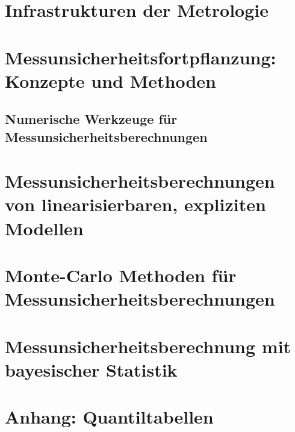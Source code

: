 \documentclass[a4paper,11pt]{book}
\begin{document}
\chapter{Infrastrukturen der Metrologie}

%
\chapter{Messunsicherheitsfortpflanzung: Konzepte und Methoden}
\label{unsicherheitsfortpfLin}

%
\section{Numerische Werkzeuge für Messunsicherheitsberechnungen}

%

\chapter{Messunsicherheitsberechnungen von linearisierbaren, expliziten Modellen}
\label{linearisierbareMUfortpf}


\chapter{Monte-Carlo Methoden für Messunsicherheitsberechnungen}
\label{montecarloMU}

%
\chapter{Messunsicherheitsberechnung mit bayesischer Statistik}
\label{bayesMU}



\chapter{Anhang: Quantiltabellen}
\label{quantiltabellen}
\end{document}
